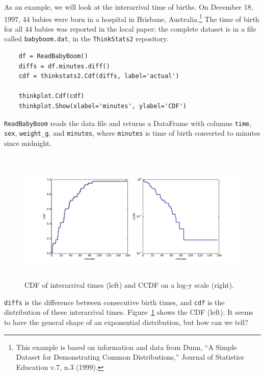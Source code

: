 \documentclass[12pt]{book}
\begin{document}
As an example, we will look at the interarrival time of births.
On December 18, 1997, 44 babies were born in a hospital in Brisbane,
Australia.\footnote{This example is based on information and data from
  Dunn, ``A Simple Dataset for Demonstrating Common Distributions,''
  Journal of Statistics Education v.7, n.3 (1999).}  The time of
birth for all 44 babies was reported in the local paper; the
complete dataset is in a file called {\tt babyboom.dat}, in the
{\tt ThinkStats2} repository.
 

\begin{verbatim}
    df = ReadBabyBoom()
    diffs = df.minutes.diff()
    cdf = thinkstats2.Cdf(diffs, label='actual')

    thinkplot.Cdf(cdf)
    thinkplot.Show(xlabel='minutes', ylabel='CDF')
\end{verbatim}

{\tt ReadBabyBoom} reads the data file and returns a DataFrame
with columns {\tt time}, {\tt sex}, \verb"weight_g", and {\tt minutes},
where {\tt minutes} is time of birth converted to minutes since
midnight.

\begin{figure}
\centerline{\includegraphics[height=2.5in]{figs/analytic_interarrivals.pdf}}
\caption{CDF of interarrival times (left) and CCDF on a log-y scale (right).}
\label{analytic_interarrival_cdf}
\end{figure}


{\tt diffs} is the difference between consecutive birth times, and
{\tt cdf} is the distribution of these interarrival times.
Figure~\ref{analytic_interarrival_cdf} shows the CDF (left).  It seems
to have the general shape of an exponential distribution, but how can
we tell?
\end{document}

